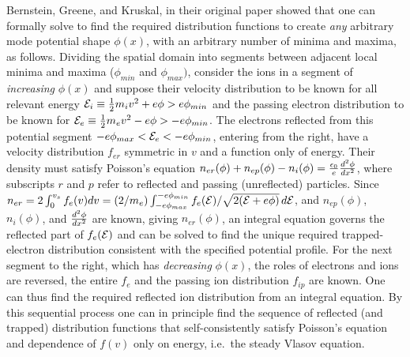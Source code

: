 \documentclass[pre]{revtex4-2}
\def\energy{{\cal E}}
\begin{document}
Bernstein, Greene, and Kruskal, in their original
paper\cite{Bernstein1957} showed that one can formally solve to find
the required distribution functions to create \emph{any} arbitrary
mode potential shape $\phi(x)$, with an arbitrary number of minima and
maxima, as follows. Dividing the spatial domain into segments between
adjacent local minima and maxima ($\phi_{min}$ and $\phi_{max})$,
consider the ions in a segment of \emph{increasing} $\phi(x)$ and
suppose their velocity distribution to be known for all relevant
energy $\energy_i\equiv {1\over 2}m_iv^2+e\phi >e\phi_{min}$ and the
passing electron distribution to be known for
$\energy_e\equiv{1\over 2}m_ev^2-e\phi >-e\phi_{min}$. The electrons
reflected from this potential segment
$-e\phi_{max}<\energy_e<-e\phi_{min}$, entering from the right, have a
velocity distribution $f_{er}$ symmetric in $v$ and a function only of
energy. Their density must satisfy Poisson's equation
$n_{er}(\phi)+n_{ep}(\phi)-n_{i}(\phi)={\epsilon_0\over
  e}{d^2\phi\over dx^2}$, where subscripts $r$ and $p$ refer to
reflected and passing (unreflected) particles. Since
$n_{er}=2\int_0^{v_s} f_e(v)dv=
(2/m_e)\int_{-e\phi_{max}}^{-e\phi_{min}}f_e(\energy)/\sqrt{2(\energy+e\phi)}\,
d\energy$, and $n_{ep}(\phi)$, $n_{i}(\phi)$, and
${d^2\phi\over dx^2}$ are known, giving $n_{er}(\phi)$, an integral
equation governs the reflected part of $f_{e}(\energy)$ and can be
solved to find the unique required trapped-electron distribution
consistent with the specified potential profile. For the next segment
to the right, which has \emph{decreasing} $\phi(x)$, the roles of
electrons and ions are reversed, the entire $f_e$ and the passing ion
distribution $f_{ip}$ are known. One can thus find the required
reflected ion distribution from an integral equation. By this
sequential process one can in principle find the sequence of reflected
(and trapped) distribution functions that self-consistently satisfy
Poisson's equation and dependence of $f(v)$ only on energy, i.e.\ the
steady Vlasov equation.
\end{document}
